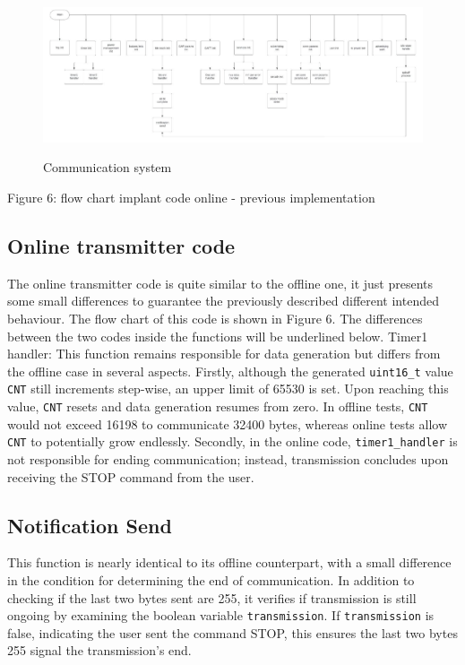\documentclass{Configuration_Files/PoliMi3i_thesis}
\begin{document}
\begin{figure}[H]
	\includegraphics[scale=0.3]{Previous Implementation/Screenshot 2024-08-15 at 11.01.21.png}
	\centering
    \label{prev_6}
    \caption{Communication system}
\end{figure}

Figure 6: flow chart implant code online - previous implementation

\subsection{Online transmitter code}

The online transmitter code is quite similar to the offline one, it just presents some small differences to guarantee the previously described different intended behaviour. The flow chart of this code is shown in Figure 6. The differences between the two codes inside the functions will be underlined below. 
Timer1 handler: This function remains responsible for data generation but differs from the offline case in several aspects. Firstly, although the generated \texttt{uint16\_t} value \texttt{CNT} still increments step-wise, an upper limit of 65530 is set. Upon reaching this value, \texttt{CNT} resets and data generation resumes from zero. In offline tests, \texttt{CNT} would not exceed 16198 to communicate 32400 bytes, whereas online tests allow \texttt{CNT} to potentially grow endlessly. Secondly, in the online code, \texttt{timer1\_handler} is not responsible for ending communication; instead, transmission concludes upon receiving the STOP command from the user.

\subsection*{Notification Send}
This function is nearly identical to its offline counterpart, with a small difference in the condition for determining the end of communication. In addition to checking if the last two bytes sent are 255, it verifies if transmission is still ongoing by examining the boolean variable \texttt{transmission}. If \texttt{transmission} is false, indicating the user sent the command STOP, this ensures the last two bytes 255 signal the transmission's end.
\end{document}
